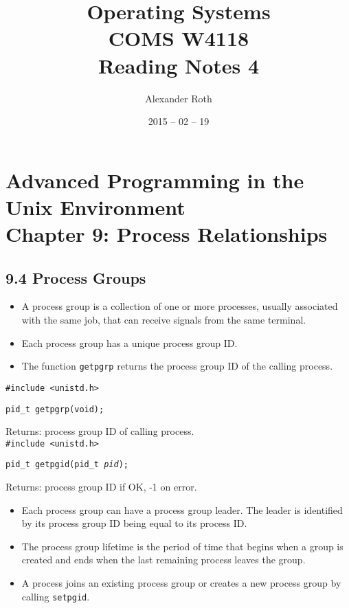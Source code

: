 \documentclass[]{article}
\begin{document}
\newcommand{\code}{\texttt}
\newtheorem{thm}{Theorem}
\title{Operating Systems \\ COMS W4118 \\ Reading Notes 4}
\author{Alexander Roth}
\date{2015 -- 02 -- 19}
\maketitle

\section*{Advanced Programming in the Unix Environment \\
Chapter 9: Process Relationships}
\subsection*{9.4 Process Groups}
\begin{itemize}
\item A process group is a collection of one or more processes, usually
associated with the same job, that can receive signals from the same terminal.
\item Each process group has a unique process group ID.
\item The function \code{getpgrp} returns the process group ID of the calling
process.
\end{itemize}

\code{\#include <unistd.h>}

\code{pid\_t getpgrp(void);}

Returns: process group ID of calling process.\\

\code{\#include <unistd.h>}

\code{pid\_t getpgid(pid\_t \emph{pid});}

Returns: process group ID if OK, -1 on error.

\begin{itemize}
\item Each process group can have a process group leader. The leader is
identified by its process group ID being equal to its process ID.
\item The process group lifetime is the period of time that begins when a group
is created and ends when the last remaining process leaves the group.
\item A process joins an existing process group or creates a new process group
by calling \code{setpgid}.
\end{itemize}
\end{document}
